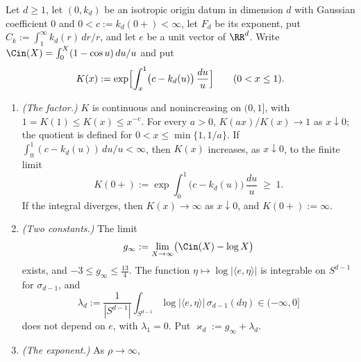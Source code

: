 \begin{proposition}
\label{prop:isotropic-exponent-profile}
\leanok
Let $d \ge 1$, let $(0,k_d)$ be an isotropic origin datum in dimension $d$ with Gaussian
coefficient $0$ and $0 < c := k_d(0{+}) < \infty$, let $F_d$ be its exponent, put
$C_k := \int_1^\infty k_d(r)\,dr/r$, and let $e$ be a unit vector of $\RR^d$. Write
$\Cin(X) = \int_0^X (1 - \cos u)\,du/u$ and put
\[
  K(x) := \exp\Bigl[\int_x^1 \bigl(c - k_d(u)\bigr)\,\frac{du}{u}\Bigr] \qquad (0 < x \le 1) .
\]
\begin{enumerate}
\item \emph{(The factor.)} $K$ is continuous and nonincreasing on $(0,1]$, with
$1 = K(1) \le K(x) \le x^{-c}$. For every $a > 0$, $K(ax)/K(x) \to 1$ as $x \downarrow 0$; the
quotient is defined for $0 < x \le \min\{1, 1/a\}$. If $\int_0^1 (c - k_d(u))\,du/u < \infty$,
then $K(x)$ increases, as $x \downarrow 0$, to the finite limit
\[
  K(0{+}) := \exp\int_0^1 \bigl(c - k_d(u)\bigr)\,\frac{du}{u} \;\ge\; 1 .
\]
If the integral diverges, then $K(x) \to \infty$ as $x \downarrow 0$, and $K(0{+}) := \infty$.
\item \emph{(Two constants.)} The limit
\[
  g_\infty := \lim_{X\to\infty}\bigl(\Cin(X) - \log X\bigr)
\]
exists, and $-3 \le g_\infty \le \tfrac{13}{4}$. The function
$\eta \mapsto \log|\langle e,\eta\rangle|$ is integrable on $S^{d-1}$ for $\sigma_{d-1}$, and
\[
  \lambda_d := \frac{1}{|S^{d-1}|}\int_{S^{d-1}}\log|\langle e,\eta\rangle|\,\sigma_{d-1}(d\eta)
  \in (-\infty, 0]
\]
does not depend on $e$, with $\lambda_1 = 0$. Put $\varkappa_d := g_\infty + \lambda_d$.
\item \emph{(The exponent.)} As $\rho \to \infty$,

\end{enumerate}
\end{proposition}
